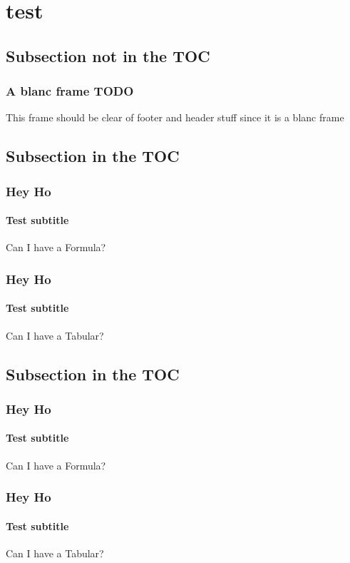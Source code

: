 \documentclass[german,aspectratio=169,notoc,draft]{tudbeamer}%
\begin{document}
\section{test}
\subsection*{Subsection not in the TOC}
\begin{frame}[allowframebreaks]
	\frametitle{A blanc frame TODO}
	This frame should be clear of footer and header stuff since it is a blanc frame
\end{frame}

\subsection{Subsection in the TOC}
\begin{frame}
	\frametitle{Hey Ho}
	\framesubtitle{Test subtitle}
	Can I have a Formula?
\end{frame}
\begin{frame}
	\frametitle{Hey Ho}
	\framesubtitle{Test subtitle}
	Can I have a Tabular?
\end{frame}

\subsection{Subsection in the TOC}
\begin{frame}
	\frametitle{Hey Ho}
	\framesubtitle{Test subtitle}
	Can I have a Formula?
\end{frame}
\begin{frame}
	\frametitle{Hey Ho}
	\framesubtitle{Test subtitle}
	Can I have a Tabular?
\end{frame}
\end{document}
